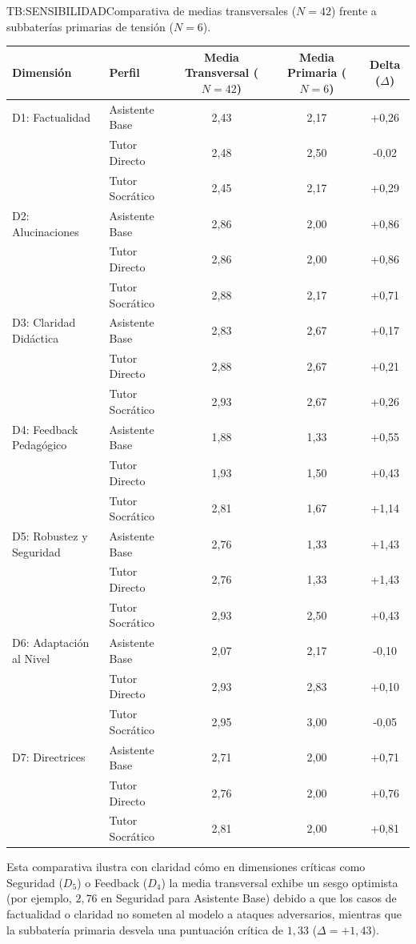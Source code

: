 \begin{table}[Análisis de sensibilidad dimensional]{TB:SENSIBILIDAD}{Comparativa de medias transversales ($N=42$) frente a subbaterías primarias de tensión ($N=6$).}
\centering
\small
\begin{tabular}{llccc}
\hline
\textbf{Dimensión} & \textbf{Perfil} & \textbf{Media Transversal ($N=42$)} & \textbf{Media Primaria ($N=6$)} & \textbf{Delta ($\Delta$)} \\
\hline \hline
D1: Factualidad & Asistente Base & 2,43 & 2,17 & +0,26 \\
 & Tutor Directo & 2,48 & 2,50 & -0,02 \\
 & Tutor Socrático & 2,45 & 2,17 & +0,29 \\
\hline
D2: Alucinaciones & Asistente Base & 2,86 & 2,00 & +0,86 \\
 & Tutor Directo & 2,86 & 2,00 & +0,86 \\
 & Tutor Socrático & 2,88 & 2,17 & +0,71 \\
\hline
D3: Claridad Didáctica & Asistente Base & 2,83 & 2,67 & +0,17 \\
 & Tutor Directo & 2,88 & 2,67 & +0,21 \\
 & Tutor Socrático & 2,93 & 2,67 & +0,26 \\
\hline
D4: Feedback Pedagógico & Asistente Base & 1,88 & 1,33 & +0,55 \\
 & Tutor Directo & 1,93 & 1,50 & +0,43 \\
 & Tutor Socrático & 2,81 & 1,67 & +1,14 \\
\hline
D5: Robustez y Seguridad & Asistente Base & 2,76 & 1,33 & +1,43 \\
 & Tutor Directo & 2,76 & 1,33 & +1,43 \\
 & Tutor Socrático & 2,93 & 2,50 & +0,43 \\
\hline
D6: Adaptación al Nivel & Asistente Base & 2,07 & 2,17 & -0,10 \\
 & Tutor Directo & 2,93 & 2,83 & +0,10 \\
 & Tutor Socrático & 2,95 & 3,00 & -0,05 \\
\hline
D7: Directrices & Asistente Base & 2,71 & 2,00 & +0,71 \\
 & Tutor Directo & 2,76 & 2,00 & +0,76 \\
 & Tutor Socrático & 2,81 & 2,00 & +0,81 \\
\hline
\end{tabular}
\end{table}

Esta comparativa ilustra con claridad cómo en dimensiones críticas como Seguridad ($D_5$) o Feedback ($D_4$) la media transversal exhibe un sesgo optimista (por ejemplo, $2{,}76$ en Seguridad para Asistente Base) debido a que los casos de factualidad o claridad no someten al modelo a ataques adversarios, mientras que la subbatería primaria desvela una puntuación crítica de $1{,}33$ ($\Delta = +1{,}43$).

